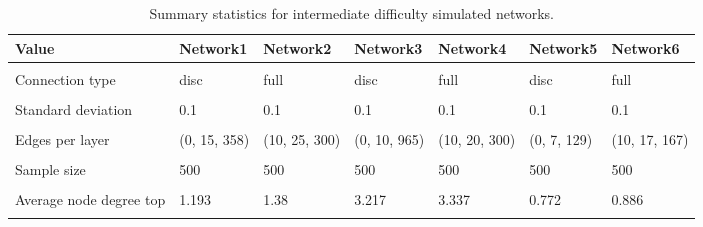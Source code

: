 \documentclass[
]{article}
\begin{document}
\begin{table}
\centering\centering
\caption{\label{tab:unnamed-chunk-5}Summary statistics for intermediate difficulty simulated networks.}
\centering
\fontsize{10}{12}\selectfont
\fontsize{10}{12}\selectfont
\begin{tabular}[t]{>{\raggedright\arraybackslash}p{8em}llllll}
\toprule
Value & Network1 & Network2 & Network3 & Network4 & Network5 & Network6\\
\midrule
\cellcolor{gray!10}{Subgraph type} & \cellcolor{gray!10}{small world} & \cellcolor{gray!10}{small world} & \cellcolor{gray!10}{scale free} & \cellcolor{gray!10}{scale free} & \cellcolor{gray!10}{random graph} & \cellcolor{gray!10}{random graph}\\
Connection type & disc & full & disc & full & disc & full\\
\cellcolor{gray!10}{Layers} & \cellcolor{gray!10}{3} & \cellcolor{gray!10}{3} & \cellcolor{gray!10}{3} & \cellcolor{gray!10}{3} & \cellcolor{gray!10}{3} & \cellcolor{gray!10}{3}\\
Standard deviation & 0.1 & 0.1 & 0.1 & 0.1 & 0.1 & 0.1\\
\cellcolor{gray!10}{Nodes per layer} & \cellcolor{gray!10}{(5, 15, 300)} & \cellcolor{gray!10}{(5, 15, 300)} & \cellcolor{gray!10}{(5, 15, 300)} & \cellcolor{gray!10}{(5, 15, 300)} & \cellcolor{gray!10}{(5, 12, 167)} & \cellcolor{gray!10}{(5, 12, 167)}\\
\addlinespace
Edges per layer & (0, 15, 358) & (10, 25, 300) & (0, 10, 965) & (10, 20, 300) & (0, 7, 129) & (10, 17, 167)\\
\cellcolor{gray!10}{Subgraph probability} & \cellcolor{gray!10}{0.05} & \cellcolor{gray!10}{0.05} & \cellcolor{gray!10}{0.05} & \cellcolor{gray!10}{0.05} & \cellcolor{gray!10}{0.05} & \cellcolor{gray!10}{0.05}\\
Sample size & 500 & 500 & 500 & 500 & 500 & 500\\
\cellcolor{gray!10}{Modularity (top)} & \cellcolor{gray!10}{0.8} & \cellcolor{gray!10}{0.686} & \cellcolor{gray!10}{0.781} & \cellcolor{gray!10}{0.739} & \cellcolor{gray!10}{0.789} & \cellcolor{gray!10}{0.663}\\
Average node degree top & 1.193 & 1.38 & 3.217 & 3.337 & 0.772 & 0.886\\
\addlinespace
\cellcolor{gray!10}{Avg connections within top communities} & \cellcolor{gray!10}{71.6} & \cellcolor{gray!10}{73.4} & \cellcolor{gray!10}{193} & \cellcolor{gray!10}{191.6} & \cellcolor{gray!10}{25.8} & \cellcolor{gray!10}{25.8}\\

\end{tabular}
\end{table}
\end{document}
